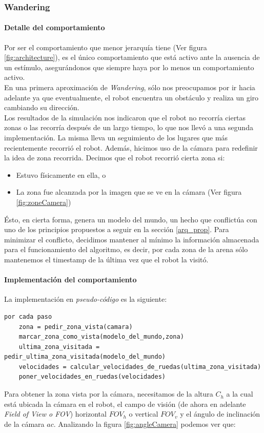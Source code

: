 \subsubsection{Wandering}
\label{wandering}

\paragraph{Detalle del comportamiento} 
Por ser el comportamiento que menor jerarqu\'ia tiene (Ver figura
\ref{fig:architecture}), es el \'unico comportamiento que est\'a activo
ante la ausencia de un est\'imulo, asegur\'andonos que siempre haya por lo menos
un comportamiento activo.
\\\indent
En una primera aproximaci\'on de \emph{Wandering}, s\'olo nos preocupamos por
ir hacia adelante ya que eventualmente, el robot encuentra un obst\'aculo y
realiza un giro cambiando su direcci\'on.
\\\indent
Los resultados de la simulaci\'on nos indicaron que el robot no recorr\'ia
ciertas zonas o las recorr\'ia despu\'es de un largo tiempo, lo que nos llev\'o
a una segunda implementaci\'on. La misma lleva un seguimiento de los
lugares que m\'as recientemente recorri\'o el robot. Adem\'as, hicimos uso de la
c\'amara para redefinir la idea de zona recorrida. Decimos que el robot
recorri\'o cierta zona si:
\begin{itemize}
	\item{}Estuvo f\'isicamente en ella, o
	\item{}La zona fue alcanzada por la imagen que se ve en la c\'amara
			(Ver figura \ref{fig:zoneCamera})
\end{itemize}
\'Esto, en cierta forma, genera un modelo del mundo, un hecho que
conflict\'ua con uno de los principios propuestos a seguir en la secci\'on
\ref{arq_prop}. Para minimizar el conflicto, decidimos mantener al m\'inimo la
informaci\'on almacenada para el funcionamiento del algoritmo, es decir, por
cada zona de la arena s\'olo mantenemos el timestamp de la \'ultima vez que el
robot la visit\'o.

\paragraph{Implementaci\'on del comportamiento}

La implementaci\'on en \emph{pseudo-c\'odigo} es la siguiente:
\begin{verbatim}
por cada paso
    zona = pedir_zona_vista(camara)
    marcar_zona_como_vista(modelo_del_mundo,zona)
    ultima_zona_visitada = pedir_ultima_zona_visitada(modelo_del_mundo)
    velocidades = calcular_velocidades_de_ruedas(ultima_zona_visitada)
    poner_velocidades_en_ruedas(velocidades)
\end{verbatim}
Para obtener la zona vista por la c\'amara, necesitamos de la altura $C_h$ a la
cual est\'a ubicada la c\'amara en el robot, el campo de visi\'on (de ahora en
adelante \emph{Field of View o FOV}) horizontal $FOV_h$ o vertical $FOV_v$ y
el \'angulo de inclinaci\'on de la c\'amara $ac$. Analizando la figura 
\ref{fig:angleCamera} podemos ver que:


